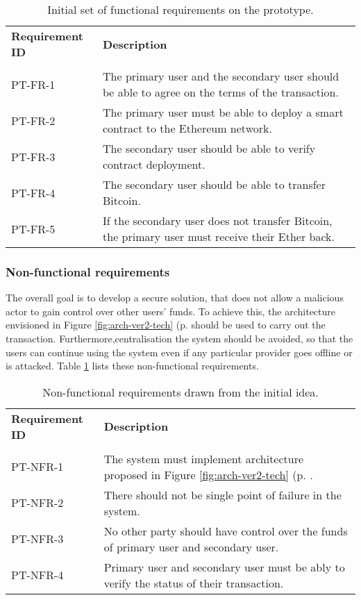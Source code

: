 \begin{table}[ht]
    \centering
    \begin{tabularx}{\textwidth}{|l X|}
    \hline
    \textbf{Requirement ID}& \textbf{Description}\\
    &\\
    PT-FR-1 & The primary user and the secondary user should be able to agree on the terms of the transaction.\\
    PT-FR-2 & The primary user must be able to deploy a smart contract to the Ethereum network.\\
    PT-FR-3 & The secondary user should be able to verify contract deployment.\\
    PT-FR-4 & The secondary user should be able to transfer Bitcoin.\\
    PT-FR-5 & If the secondary user does not transfer Bitcoin, the primary user must receive their Ether back.\\
    \hline
    \end{tabularx}
    \caption{Initial set of functional requirements on the prototype.}
    \label{tab:pt-func-reqs}
    \end{table}
% 
% 
\subsubsection{Non-functional requirements}
The overall goal is to develop a secure solution, that does not allow a malicious actor to gain control over other users' funds. To achieve this, the architecture envisioned in Figure \ref{fig:arch-ver2-tech} (p. \pageref{fig:arch-ver2-tech} should be used to carry out the transaction. Furthermore,centralisation the system should be avoided, so that the users can continue using the system even if any particular provider goes offline or is attacked. Table \ref{tab:pt-func-reqs} lists these non-functional requirements.

\begin{table}[ht]
    \centering
    \begin{tabularx}{\textwidth}{|l X|}
    \hline
    \textbf{Requirement ID}&\textbf{Description}\\
    &\\
    PT-NFR-1&The system must implement architecture proposed in Figure \ref{fig:arch-ver2-tech} (p. \pageref{fig:arch-ver2-tech}.\\
    PT-NFR-2&There should not be single point of failure in the system.\\
    PT-NFR-3&No other party should have control over the funds of primary user and secondary user.\\
    PT-NFR-4&Primary user and secondary user must be ably to verify the status of their transaction.\\
    \hline
    \end{tabularx}
    
    \caption{Non-functional requirements drawn from the initial idea.}
    \label{tab:pt-nonfunc-reqs}
\end{table}

